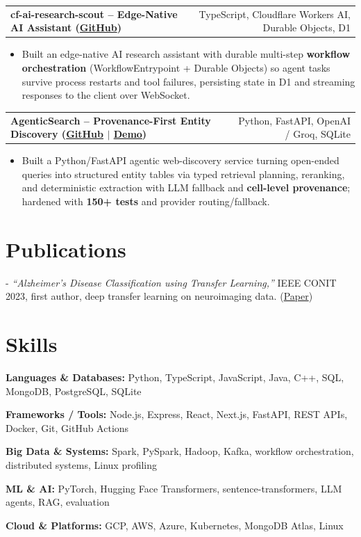 \documentclass[letterpaper,11pt]{article}
\makeatletter
\newcommand{\projItem}[2]{%
  \vspace{2pt}
  \begin{tabular*}{\textwidth}{@{}l@{\extracolsep{\fill}}r@{}}
    \textbf{#1} & #2 \\
  \end{tabular*}\par\vspace{-3pt}
}
\newcommand{\skillLine}[2]{\textbf{#1:} #2\par\vspace{1.5pt}}
\newcommand{\inlineBlock}[1]{{\setlength{\leftskip}{0.18in}\small #1\par}}
\makeatother
\begin{document}
\projItem{cf-ai-research-scout -- Edge-Native AI Assistant {\normalfont\small(\href{https://github.com/Deva-1903/cf_ai_research_scout}{GitHub})}}{TypeScript, Cloudflare Workers AI, Durable Objects, D1}
\begin{itemize}
  \item Built an edge-native AI research assistant with durable multi-step \textbf{workflow orchestration} (WorkflowEntrypoint + Durable Objects) so agent tasks survive process restarts and tool failures, persisting state in D1 and streaming responses to the client over WebSocket.
\end{itemize}

\projItem{AgenticSearch -- Provenance-First Entity Discovery {\normalfont\small(\href{https://github.com/Deva-1903/ciir_agentic_search}{GitHub} $\vert$ \href{https://agentic-search-negglszkwa-uc.a.run.app}{Demo})}}{Python, FastAPI, OpenAI / Groq, SQLite}
\begin{itemize}
  \item Built a Python/FastAPI agentic web-discovery service turning open-ended queries into structured entity tables via typed retrieval planning, reranking, and deterministic extraction with LLM fallback and \textbf{cell-level provenance}; hardened with \textbf{150+ tests} and provider routing/fallback.
\end{itemize}

\section{Publications}
\vspace{2pt}
\inlineBlock{- \textit{``Alzheimer's Disease Classification using Transfer Learning,''} IEEE CONIT 2023, first author, deep transfer learning on neuroimaging data. {\normalfont\small(\href{https://ieeexplore.ieee.org/document/10205760}{Paper})}}

\section{Skills}
\skillLine{Languages \& Databases}{Python, TypeScript, JavaScript, Java, C++, SQL, MongoDB, PostgreSQL, SQLite}
\skillLine{Frameworks / Tools}{Node.js, Express, React, Next.js, FastAPI, REST APIs, Docker, Git, GitHub Actions}
\skillLine{Big Data \& Systems}{Spark, PySpark, Hadoop, Kafka, workflow orchestration, distributed systems, Linux profiling}
\skillLine{ML \& AI}{PyTorch, Hugging Face Transformers, sentence-transformers, LLM agents, RAG, evaluation}
\skillLine{Cloud \& Platforms}{GCP, AWS, Azure, Kubernetes, MongoDB Atlas, Linux}
\end{document}
